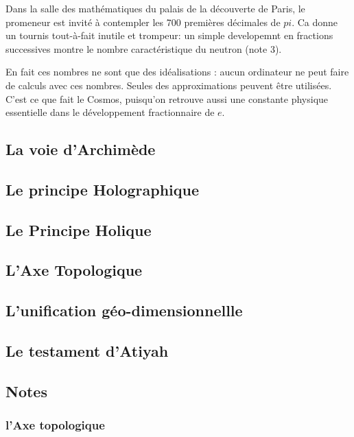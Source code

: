 \documentclass[a4paper,12pt]{article}
\begin{document}
Dans la salle des mathématiques du palais de la découverte de Paris, le promeneur est invité à contempler les 700 premières décimales de $pi$. Ca donne un tournis tout-à-fait inutile et trompeur: un simple developemnt en fractions successives montre le nombre caractéristique du neutron (note 3).

En fait ces nombres ne sont que des idéalisations : aucun ordinateur ne peut faire de calculs avec ces nombres. Seules des approximations peuvent être utilisées. C'est ce que fait le Cosmos, puisqu'on retrouve aussi une constante physique essentielle dans le développement fractionnaire de $e$. 



\subsection{La voie d'Archimède}










\subsection{Le principe Holographique}
\subsection{Le Principe Holique}
\subsection{L'Axe Topologique}
\subsection{L'unification géo-dimensionnellle}
\subsection{Le testament d'Atiyah}




\subsection{Notes}
\subsubsection{l'Axe topologique}
\end{document}
